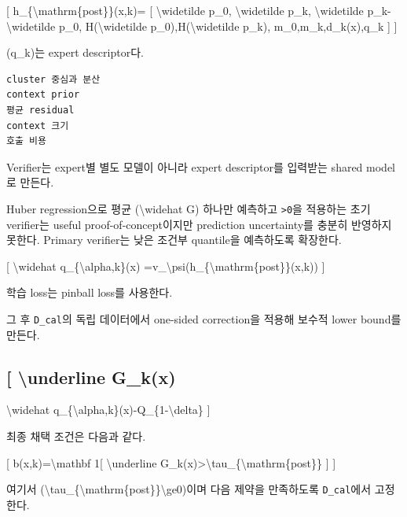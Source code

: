 [ h\_\allowbreak{}\{\textbackslash{}mathrm\{post\}\}(x,k)=\allowbreak{} [ \textbackslash{}widetilde p\_\allowbreak{}0, \textbackslash{}widetilde p\_\allowbreak{}k, \textbackslash{}widetilde p\_\allowbreak{}k-\textbackslash{}widetilde p\_\allowbreak{}0, H(\textbackslash{}widetilde p\_\allowbreak{}0),H(\textbackslash{}widetilde p\_\allowbreak{}k), m\_\allowbreak{}0,m\_\allowbreak{}k,d\_\allowbreak{}k(x),q\_\allowbreak{}k ] ]

(q\_\allowbreak{}k)는 expert descriptor다.


\begin{Verbatim}[breaklines=true,breakanywhere=true,fontsize=\scriptsize]
cluster 중심과 분산
context prior
평균 residual
context 크기
호출 비용

\end{Verbatim}
Verifier는 expert별 별도 모델이 아니라 expert descriptor를 입력받는 shared model로 만든다.

Huber regression으로 평균 (\textbackslash{}widehat G) 하나만 예측하고 \texttt{>0}을 적용하는 초기 verifier는 useful proof-of-concept이지만 prediction uncertainty를 충분히 반영하지 못한다. Primary verifier는 낮은 조건부 quantile을 예측하도록 확장한다.

[ \textbackslash{}widehat q\_\allowbreak{}\{\textbackslash{}alpha,k\}(x) =\allowbreak{}v\_\allowbreak{}\textbackslash{}psi(h\_\allowbreak{}\{\textbackslash{}mathrm\{post\}\}(x,k)) ]

학습 loss는 pinball loss를 사용한다.

그 후 \texttt{D\_\allowbreak{}\allowbreak{}cal}의 독립 데이터에서 one-sided correction을 적용해 보수적 lower bound를 만든다.

\subsection{[ \textbackslash{}underline G\_\allowbreak{}k(x)}
\textbackslash{}widehat q\_\allowbreak{}\{\textbackslash{}alpha,k\}(x)-Q\_\allowbreak{}\{1-\textbackslash{}delta\} ]

최종 채택 조건은 다음과 같다.

[ b(x,k)=\allowbreak{}\textbackslash{}mathbf 1[ \textbackslash{}underline G\_\allowbreak{}k(x)>\textbackslash{}tau\_\allowbreak{}\{\textbackslash{}mathrm\{post\}\} ] ]

여기서 (\textbackslash{}tau\_\allowbreak{}\{\textbackslash{}mathrm\{post\}\}\textbackslash{}ge0)이며 다음 제약을 만족하도록 \texttt{D\_\allowbreak{}\allowbreak{}cal}에서 고정한다.

